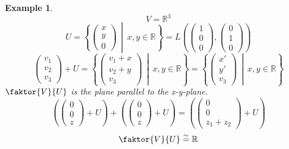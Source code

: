 \documentclass[a4paper,landscape,twocolumn]{article}
\newcommand\setdef[2]{\left\{#1\,\middle|\,#2\right\}}
\newtheorem{ex}{Example}[section]
\begin{document}
\begin{ex}
  \label{bsp-4-25}
  \[ V = \mathbb R^3 \]
  \[
    U = \setdef{\begin{pmatrix} x \\ y \\ 0\end{pmatrix}}{x,y \in \mathbb R}
      = L\left(\begin{pmatrix} 1 \\ 0 \\ 0 \end{pmatrix}, \begin{pmatrix} 0 \\ 1 \\ 0 \end{pmatrix}\right)
  \] \[
    \begin{pmatrix} v_1 \\ v_2 \\ v_3 \end{pmatrix} + U
      = \setdef{\begin{pmatrix} v_1 + x \\ v_2 + y \\ v_3 \end{pmatrix}}{x,y \in \mathbb R}
      = \setdef{\begin{pmatrix} x' \\ y' \\ v_3 \end{pmatrix}}{x,y \in \mathbb R}
  \]
  $\faktor{V}{U}$ is the plane parallel to the x-y-plane.
  \[
    \left(\begin{pmatrix} 0 \\ 0 \\ z \end{pmatrix} + U\right)
    + \left(\begin{pmatrix} 0 \\ 0 \\ z \end{pmatrix} + U\right)
    = \left(\begin{pmatrix} 0 \\ 0 \\ z_1 + z_2 \end{pmatrix} + U\right)
  \]
  \[ \faktor{V}{U} \stackrel\sim{=} \mathbb R \]
\end{ex}
\end{document}
